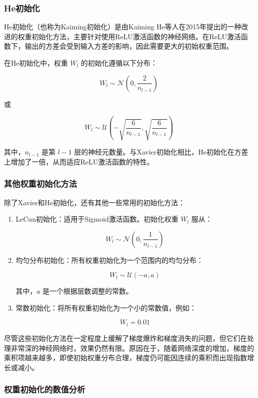 \documentclass[12pt,a4paper]{amsart}
\begin{document}
\subsubsection{He初始化}

He初始化（也称为Kaiming初始化）是由Kaiming He等人在2015年提出的一种改进的权重初始化方法，主要针对使用ReLU激活函数的神经网络。在ReLU激活函数下，输出的方差会受到输入方差的影响，因此需要更大的初始权重范围。

在He初始化中，权重 \( W_l \) 的初始化遵循以下分布：

\[ W_l \sim \mathcal{N}\left(0, \frac{2}{n_{l-1}}\right) \]

或

\[ W_l \sim \mathcal{U}\left(-\sqrt{\frac{6}{n_{l-1}}}, \sqrt{\frac{6}{n_{l-1}}}\right) \]

其中，\( n_{l-1} \) 是第 \( l-1 \) 层的神经元数量。与Xavier初始化相比，He初始化在方差上增加了一倍，从而适应ReLU激活函数的特性。

\subsubsection{其他权重初始化方法}

除了Xavier和He初始化，还有其他一些常用的初始化方法：

\begin{enumerate}


  \item LeCun初始化：适用于Sigmoid激活函数。初始化权重 \( W_l \) 服从：

  \[ W_l \sim \mathcal{N}\left(0, \frac{1}{n_{l-1}}\right) \]

  \item 均匀分布初始化：所有权重初始化为一个范围内的均匀分布：

  \[ W_l \sim \mathcal{U}(-a, a) \]

  其中，\( a \) 是一个根据层数调整的常数。

  \item 常数初始化：将所有权重初始化为一个小的常数值，例如：

  \[ W_l = 0.01 \]

\end{enumerate}

尽管这些初始化方法在一定程度上缓解了梯度爆炸和梯度消失的问题，但它们在处理非常深的神经网络时，效果仍然有限。原因在于，随着网络深度的增加，梯度的乘积项越来越多，即使初始权重分布合理，梯度仍可能因连续的乘积而出现指数增长或减小。

\subsubsection{权重初始化的数值分析}
\end{document}
